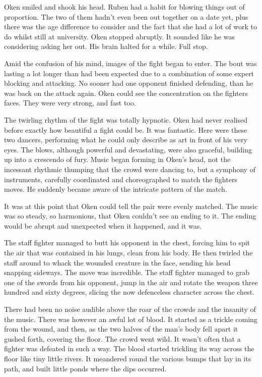Oken smiled and shook his head.  Ruben had a habit for blowing things out of proportion.  The two of them hadn't even been out together on a date yet, plus there was the age difference to consider and the fact that she had a lot of work to do whilst still at university.  Oken stopped abruptly.  It sounded like he was considering asking her out.  His brain halted for a while.  Full stop.

Amid the confusion of his mind, images of the fight began to enter.  The bout was lasting a lot longer than had been expected due to a combination of some expert blocking and attacking.  No sooner had one opponent finished defending, than he was back on the attack again.  Oken could see the concentration on the fighters faces.  They were very strong, and fast too.

The twirling rhythm of the fight was totally hypnotic.  Oken had never realised before exactly how beautiful a fight could be.  It was fantastic.  Here were these two dancers, performing what he could only describe as art in front of his very eyes.  The blows, although powerful and devastating, were also graceful, building up into a crescendo of fury.  Music began forming in Oken's head, not the incessant rhythmic thumping that the crowd were dancing to, but a symphony of instruments, carefully coordinated and choreographed to match the fighters moves.  He suddenly became aware of the intricate pattern of the match.

It was at this point that Oken could tell the pair were evenly matched.  The music was so steady, so harmonious, that Oken couldn't see an ending to it.  The ending would be abrupt and unexpected when it happened, and it was.

The staff fighter managed to butt his opponent in the chest, forcing him to spit the air that was contained in his lungs, clean from his body.  He then twirled the staff around to whack the wounded creature in the face, sending his head snapping sideways.  The move was incredible.  The staff fighter managed to grab one of the swords from his opponent, jump in the air and rotate the weapon three hundred and sixty degrees, slicing the now defenceless character across the chest.

There had been no noise audible above the roar of the crowds and the insanity of the music.  There was however an awful lot of blood.  It started as a trickle coming from the wound, and then, as the two halves of the man's body fell apart it gushed forth, covering the floor.  The crowd went wild.  It wasn't often that a fighter was defeated in such a way.  The blood started trickling its way across the floor like tiny little rivers.  It meandered round the various bumps that lay in its path, and built little ponds where the dips occurred.

